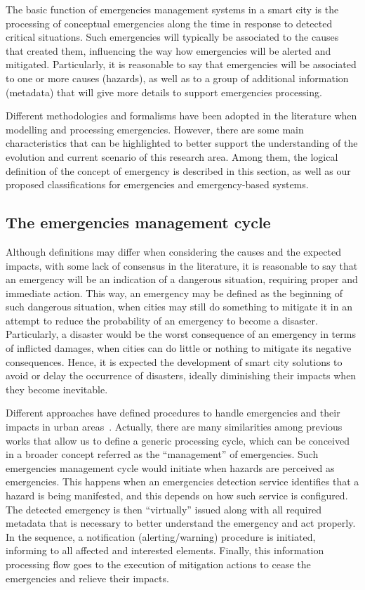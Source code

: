 \begin{refsection}
The basic function of emergencies management systems in a smart city is the processing of conceptual emergencies along the time in response to detected critical situations. Such emergencies will typically be associated to the causes that created them, influencing the way how emergencies will be alerted and mitigated. Particularly, it is reasonable to say that emergencies will be associated to one or more causes (hazards), as well as to a group of additional information (metadata) that will give more details to support emergencies processing.  

Different methodologies and formalisms have been adopted in the literature when modelling and processing emergencies. However, there are some main characteristics that can be highlighted to better support the understanding of the evolution and current scenario of this research area. Among them, the logical definition of the concept of emergency is described in this section, as well as our proposed classifications for emergencies and emergency-based systems.

\subsection{The emergencies management cycle}

Although definitions may differ when considering the causes and the expected impacts, with some lack of consensus in the literature, it is reasonable to say that an emergency will be an indication of a dangerous situation, requiring proper and immediate action. This way, an emergency may be defined as the beginning of such dangerous situation, when cities may still do something to mitigate it in an attempt to reduce the probability of an emergency to become a disaster. Particularly, a disaster would be the worst consequence of an emergency in terms of inflicted damages, when cities can do little or nothing to mitigate its negative consequences. Hence, it is expected the development of smart city solutions to avoid or delay the occurrence of disasters, ideally diminishing their impacts when they become inevitable. 

Different approaches have defined procedures to handle emergencies and their impacts in urban areas~\cite{citiesemergencies1,citiesdisasters1,emergenciesmetric2,mobilityEmergencies1,kumar2017emergency}. Actually, there are many similarities among previous works that allow us to define a generic processing cycle, which can be conceived in a broader concept referred as the ``management'' of emergencies. Such emergencies management cycle would initiate when hazards are perceived as emergencies. This happens when an emergencies detection service identifies that a hazard is being manifested, and this depends on how such service is configured. The detected emergency is then ``virtually'' issued along with all required metadata that is necessary to better understand the emergency and act properly. In the sequence, a notification (alerting/warning) procedure is initiated, informing to all affected and interested elements. Finally, this information processing flow goes to the execution of mitigation actions to cease the emergencies and relieve their impacts. 


\end{refsection}
